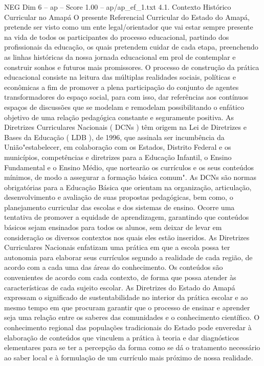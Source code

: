 \begin{textsample}{NEG Dim 6 – ap – Score 1.00 – ap/ap\_ef\_1.txt}  \label{ex:f6_neg_186}
4.1.
Contexto Histórico Curricular no Amapá O presente Referencial Curricular do Estado do Amapá, pretende ser visto como um ente legal/orientador que vai estar sempre presente na vida de todos os participantes do processo educacional, partindo dos profissionais da educação, os quais pretendem cuidar de cada etapa, preenchendo as linhas históricas da nossa jornada educacional em prol de contemplar e construir sonhos e futuros mais promissores.
O processo de construção da prática educacional consiste na leitura das múltiplas realidades sociais, políticas e econômicas a fim de promover a plena participação do conjunto de agentes transformadores do espaço social, para com isso, dar referências aos contínuos espaços de discussões que se modelam e remodelam possibilitando o enfático objetivo de uma relação pedagógica constante e seguramente positiva.
As Diretrizes Curriculares Nacionais ( DCNs ) têm origem na Lei de Diretrizes e Bases da Educação ( LDB ), de 1996, que assinala ser incumbência da União"estabelecer, em colaboração com os Estados, Distrito Federal e os municípios, competências e diretrizes para a Educação Infantil, o Ensino Fundamental e o Ensino Médio, que nortearão os currículos e os seus conteúdos mínimos, de modo a assegurar a formação básica comum".
As DCNs são normas obrigatórias para a Educação Básica que orientam na organização, articulação, desenvolvimento e avaliação de suas propostas pedagógicas, bem como, o planejamento curricular das escolas e dos sistemas de ensino.
Ocorre uma tentativa de promover a equidade de aprendizagem, garantindo que conteúdos básicos sejam ensinados para todos os alunos, sem deixar de levar em consideração os diversos contextos nos quais eles estão inseridos.
As Diretrizes Curriculares Nacionais enfatizam uma prática em que a escola possa ter autonomia para elaborar seus currículos segundo a realidade de cada região, de acordo com a cada uma das áreas do conhecimento.
Os conteúdos são convenientes de acordo com cada contexto, de forma que possa atender às características de cada sujeito escolar.
As Diretrizes do Estado do Amapá expressam o significado de sustentabilidade no interior da prática escolar e ao mesmo tempo em que procuram garantir que o processo de ensinar e aprender seja uma relação entre os saberes das comunidades e o conhecimento científico.
O conhecimento regional das populações tradicionais do Estado pode enveredar à elaboração de conteúdos que vinculem a prática à teoria e dar diagnósticos elementares para se ter a percepção da forma como se dá o tratamento necessário ao saber local e à formulação de um currículo mais próximo de nossa realidade.

\end{textsample}

